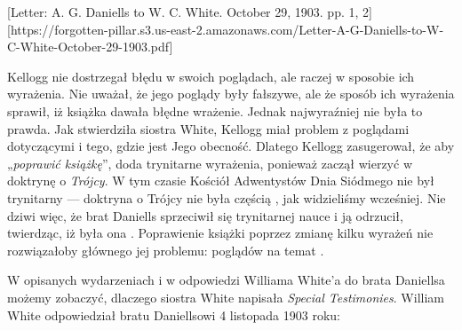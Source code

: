 
[Letter: A. G. Daniells to W. C. White. October 29, 1903. pp. 1, 2][https://forgotten-pillar.s3.us-east-2.amazonaws.com/Letter-A-G-Daniells-to-W-C-White-October-29-1903.pdf]

Kellogg nie dostrzegał błędu w swoich poglądach, ale raczej w sposobie ich wyrażenia. Nie uważał, że jego poglądy były fałszywe, ale że sposób ich wyrażenia sprawił, iż książka dawała błędne wrażenie. Jednak najwyraźniej nie była to prawda. Jak stwierdziła siostra White, Kellogg miał problem z poglądami dotyczącymi  i tego, gdzie jest Jego obecność. Dlatego Kellogg zasugerował, że aby „\textit{poprawić książkę}”, doda trynitarne wyrażenia, ponieważ zaczął wierzyć w doktrynę o \textit{Trójcy}. W tym czasie Kościół Adwentystów Dnia Siódmego nie był trynitarny — doktryna o Trójcy nie była częścią , jak widzieliśmy wcześniej. Nie dziwi więc, że brat Daniells sprzeciwił się trynitarnej nauce i ją odrzucił, twierdząc, iż była ona . Poprawienie książki poprzez zmianę kilku wyrażeń nie rozwiązałoby głównego jej problemu: poglądów na temat .

W opisanych wydarzeniach i w odpowiedzi Williama White'a do brata Daniellsa możemy zobaczyć, dlaczego siostra White napisała \textit{Special Testimonies}. William White odpowiedział bratu Daniellsowi 4 listopada 1903 roku:




